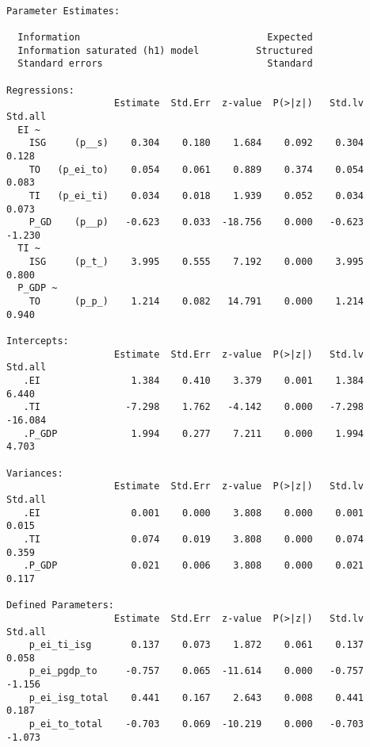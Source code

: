 \begin{verbatim}

Parameter Estimates:

  Information                                 Expected
  Information saturated (h1) model          Structured
  Standard errors                             Standard

Regressions:
                   Estimate  Std.Err  z-value  P(>|z|)   Std.lv  Std.all
  EI ~                                                                  
    ISG     (p__s)    0.304    0.180    1.684    0.092    0.304    0.128
    TO   (p_ei_to)    0.054    0.061    0.889    0.374    0.054    0.083
    TI   (p_ei_ti)    0.034    0.018    1.939    0.052    0.034    0.073
    P_GD    (p__p)   -0.623    0.033  -18.756    0.000   -0.623   -1.230
  TI ~                                                                  
    ISG     (p_t_)    3.995    0.555    7.192    0.000    3.995    0.800
  P_GDP ~                                                               
    TO      (p_p_)    1.214    0.082   14.791    0.000    1.214    0.940

Intercepts:
                   Estimate  Std.Err  z-value  P(>|z|)   Std.lv  Std.all
   .EI                1.384    0.410    3.379    0.001    1.384    6.440
   .TI               -7.298    1.762   -4.142    0.000   -7.298  -16.084
   .P_GDP             1.994    0.277    7.211    0.000    1.994    4.703

Variances:
                   Estimate  Std.Err  z-value  P(>|z|)   Std.lv  Std.all
   .EI                0.001    0.000    3.808    0.000    0.001    0.015
   .TI                0.074    0.019    3.808    0.000    0.074    0.359
   .P_GDP             0.021    0.006    3.808    0.000    0.021    0.117

Defined Parameters:
                   Estimate  Std.Err  z-value  P(>|z|)   Std.lv  Std.all
    p_ei_ti_isg       0.137    0.073    1.872    0.061    0.137    0.058
    p_ei_pgdp_to     -0.757    0.065  -11.614    0.000   -0.757   -1.156
    p_ei_isg_total    0.441    0.167    2.643    0.008    0.441    0.187
    p_ei_to_total    -0.703    0.069  -10.219    0.000   -0.703   -1.073

\end{verbatim}
